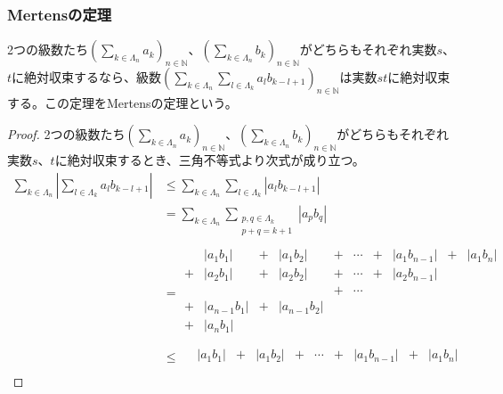 \documentclass[dvipdfmx]{jsarticle}
\begin{document}
\subsubsection{Mertensの定理}%
\begin{thm}[Mertensの定理]\label{4.1.8.18}
2つの級数たち$\left( \sum_{k \in \varLambda_{n}} a_{k} \right)_{n \in \mathbb{N}}$、$\left( \sum_{k \in \varLambda_{n}} b_{k} \right)_{n \in \mathbb{N}}$がどちらもそれぞれ実数$s$、$t$に絶対収束するなら、級数$\left( \sum_{k \in \varLambda_{n}} {\sum_{l \in \varLambda_{k}} {a_{l}b_{k - l + 1}}} \right)_{n \in \mathbb{N}}$は実数$st$に絶対収束する。この定理をMertensの定理という。
\end{thm}
\begin{proof}
2つの級数たち$\left( \sum_{k \in \varLambda_{n}} a_{k} \right)_{n \in \mathbb{N}}$、$\left( \sum_{k \in \varLambda_{n}} b_{k} \right)_{n \in \mathbb{N}}$がどちらもそれぞれ実数$s$、$t$に絶対収束するとき、三角不等式より次式が成り立つ。
\begin{align*}
\sum_{k \in \varLambda_{n}} \left| \sum_{l \in \varLambda_{k}} {a_{l}b_{k - l + 1}} \right| &\leq \sum_{k \in \varLambda_{n}} {\sum_{l \in \varLambda_{k}} \left| a_{l}b_{k - l + 1} \right|}\\
&= \sum_{k \in \varLambda_{n}} {\sum_{\begin{matrix}
p,q \in \varLambda_{k} \\
p + q = k + 1 \\
\end{matrix}} \left| a_{p}b_{q} \right|}\\
&= \begin{matrix}
\  & \left| a_{1}b_{1} \right| & + & \left| a_{1}b_{2} \right| & + & \cdots & + & \left| a_{1}b_{n - 1} \right| & + & \left| a_{1}b_{n} \right| \\
 + & \left| a_{2}b_{1} \right| & + & \left| a_{2}b_{2} \right| & + & \cdots & + & \left| a_{2}b_{n - 1} \right| & \  & \  \\
\  & \  & \  & \  & + & \cdots & \  & \  & \  & \  \\
 + & \left| a_{n - 1}b_{1} \right| & + & \left| a_{n - 1}b_{2} \right| & \  & \  & \  & \  & \  & \  \\
 + & \left| a_{n}b_{1} \right| & \  & \  & \  & \  & \  & \  & \  & \  \\
\end{matrix}\\
&\leq \begin{matrix}
\  & \left| a_{1}b_{1} \right| & + & \left| a_{1}b_{2} \right| & + & \cdots & + & \left| a_{1}b_{n - 1} \right| & + & \left| a_{1}b_{n} \right| \\

\end{matrix}
\end{align*}
\end{proof}
\end{document}
